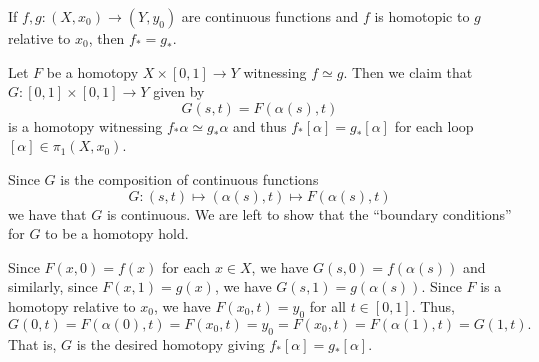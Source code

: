 \documentclass[12 pt, letterpaper]{hmcpset}
\begin{document}
\pagebreak

\begin{problem}
	If $f, g : (X, x_{0}) \to (Y, y_{0})$ are continuous functions and $f$ is homotopic to $g$ relative to $x_{0}$, then $f_{*} = g_{*}$.
\end{problem}

\begin{solution}
	Let $F$ be a homotopy $X \times [0, 1] \to Y$ witnessing $f \simeq g$. Then we claim that $G : [0, 1] \times [0, 1] \to Y$ given by
	\[
		G(s, t) = F(\alpha(s), t)
	\]
	is a homotopy witnessing $f_{*} \alpha \simeq g_{*} \alpha$ and thus $f_{*}[\alpha] = g_{*}[\alpha]$ for each loop $[\alpha] \in \pi_{1}(X, x_{0})$.

	Since $G$ is the composition of continuous functions
	\[
		G : (s, t) \mapsto (\alpha(s), t) \mapsto F(\alpha(s), t)
	\]
	we have that $G$ is continuous. We are left to show that the ``boundary conditions'' for $G$ to be a homotopy hold.

	Since $F(x, 0) = f(x)$ for each $x \in X$, we have $G(s, 0) = f(\alpha(s))$ and similarly, since $F(x, 1) = g(x)$, we have $G(s, 1) = g(\alpha(s))$. Since $F$ is a homotopy relative to $x_{0}$, we have $F(x_{0}, t) = y_{0}$ for all $t \in [0, 1]$. Thus,
	\[
		G(0, t) = F(\alpha(0), t) = F(x_{0}, t) = y_{0} = F(x_{0}, t) = F(\alpha(1), t) = G(1, t).
	\]
	That is, $G$ is the desired homotopy giving $f_{*} [\alpha] = g_{*} [\alpha]$.
\end{solution}
\end{document}
